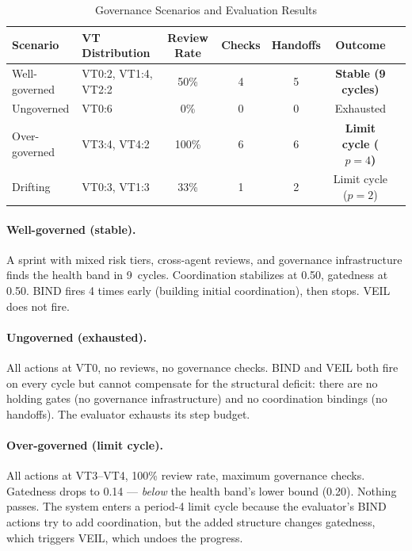 \documentclass[sigconf,nonacm]{acmart}
\begin{document}
\begin{table}[t]
  \caption{Governance Scenarios and Evaluation Results}\label{tab:scenarios}
  \small
  \begin{tabular}{@{}llccccl@{}}
    \toprule
    \textbf{Scenario} & \textbf{VT Distribution} & \textbf{Review Rate} & \textbf{Checks} & \textbf{Handoffs} & \textbf{Outcome} \\
    \midrule
    \rowcolor{cellgreen}
    Well-governed & VT0:2, VT1:4, VT2:2 & 50\% & 4 & 5 & \textbf{Stable (9 cycles)} \\
    Ungoverned & VT0:6 & 0\% & 0 & 0 & Exhausted \\
    \rowcolor{cellamber}
    Over-governed & VT3:4, VT4:2 & 100\% & 6 & 6 & \textbf{Limit cycle ($p{=}4$)} \\
    Drifting & VT0:3, VT1:3 & 33\% & 1 & 2 & Limit cycle ($p{=}2$) \\
    \bottomrule
  \end{tabular}
\end{table}

\paragraph{Well-governed (stable).}
A sprint with mixed risk tiers, cross-agent reviews, and governance
infrastructure finds the health band in 9~cycles. Coordination stabilizes
at 0.50, gatedness at 0.50. BIND fires 4 times early (building initial
coordination), then stops. VEIL does not fire.

\paragraph{Ungoverned (exhausted).}
All actions at VT0, no reviews, no governance checks. BIND and VEIL both
fire on every cycle but cannot compensate for the structural deficit: there
are no holding gates (no governance infrastructure) and no coordination
bindings (no handoffs). The evaluator exhausts its step budget.

\paragraph{Over-governed (limit cycle).}
All actions at VT3--VT4, 100\% review rate, maximum governance checks.
Gatedness drops to 0.14 --- \emph{below} the health band's lower bound
(0.20). Nothing passes. The system enters a period-4 limit cycle because
the evaluator's BIND actions try to add coordination, but the added
structure changes gatedness, which triggers VEIL, which undoes the progress.
\end{document}
